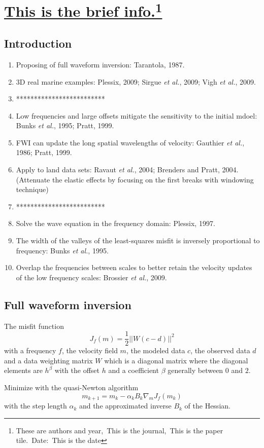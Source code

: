 \documentclass{article}
\newcommand{\Ppath}{/home/tche/Learning/Learning/Paper/}
\newcommand{\prf}{This is relative path from \Papth to the paper file}
\newcommand{\pmk}{This is the brief info.}
\newcommand{\pti}{This is the paper tile}
\newcommand{\pay}{These are authors and year}
\newcommand{\pjo}{This is the journal}
\newcommand{\pda}{This is the date}
\newcommand{\refp}[1]{\href{run:\Ppath\prf}{#1}}
\newcommand{\pinfo}{\refp{\pmk}\footnote{\pay,~\pjo,~\pti.~Date:~\pda}}
\newcommand{\sline}{*************************}
\newcommand{\etal}{\textit{et al.}}
\begin{document}
\section{\pinfo}
\subsection{Introduction}
\begin{enumerate}[\hspace{10mm}*]
  \item Proposing of full waveform inversion: Tarantola, 1987.
  \item 3D real marine examples: Plessix, 2009; Sirgue \etal, 2009; Vigh \etal, 2009.
  \item \sline
  \item Low frequencies and large offsets mitigate the sensitivity to the initial mdoel: Bunks \etal, 1995; Pratt, 1999.
  \item FWI can update the long spatial wavelengths of velocity: Gauthier \etal, 1986; Pratt, 1999.
  \item Apply to land data sets: Ravaut \etal, 2004; Brenders and Pratt, 2004. (Attenuate the elastic effects by focusing on the first breaks with windowing technique)
  \item \sline
  \item Solve the wave equation in the frequency domain: Plessix, 1997.
  \item The width of the valleys of the least-squares misfit is inversely proportional to frequency: Bunks \etal, 1995.
  \item Overlap the frequencies between scales to better retain the velocity updates of the low frequency scales: Brossier \etal, 2009.
\end{enumerate}\par
\subsection{Full waveform inversion}
The misfit function
\[ J_f(m)=\frac{1}{2}||W(c-d)||^2 \]
with a frequency $f$, the velocity field $m$, the modeled data $c$, the observed data $d$ and a data weighting matrix $W$ which is a diagonal matrix where the diagonal elements are $h^\beta$ with the offset $h$ and a coefficient $\beta$ generally between $0$ and $2$.\par
Minimize with the quasi-Newton algorithm
\[ m_{k+1}=m_k-\alpha_kB_k\nabla_mJ_f(m_k) \]
with the step length $\alpha_k$ and the approximated inverse $B_k$ of the Hessian.\par
\vspace{5mm}
\end{document}
